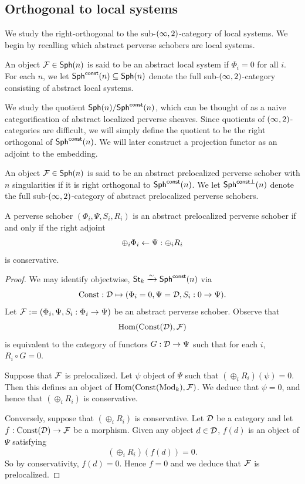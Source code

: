 \subsection{Orthogonal to local systems}\label{subsection:prelocalized}
We study the right-orthogonal to the sub-$(\infty,2)$-category of local systems.  We begin by recalling which abstract perverse schobers are local systems.

\begin{defn}\label{defn:constant}
    An object $\mathcal{F}\in\mathsf{Sph}(n)$ is said to be an abstract local system if $\Phi_i=0$ for all $i$. For each $n$, we let $\mathsf{Sph}^{\mathsf{const}}(n)\subseteq \mathsf{Sph}(n)$ denote the full sub-$(\infty,2)$-category consisting of abstract local systems.
\end{defn}

We study the quotient $\mathsf{Sph}(n)/\mathsf{Sph}^{\mathsf{const}}(n)$, which can be thought of as a naive categorification of abstract localized perverse sheaves. Since quotients of $(\infty,2)$-categories are difficult, we will simply define the quotient to be the right orthogonal of $\mathsf{Sph}^{\mathsf{const}}(n)$. We will later construct a projection functor as an adjoint to the embedding.

\begin{defn}
    An object $\mathcal{F}\in\mathsf{Sph}(n)$ is said to be an abstract prelocalized perverse schober with $n$ singularities if it is right orthogonal to $\mathsf{Sph}^{\mathsf{const}}(n)$. We let $\mathsf{Sph}^{\mathsf{const}\perp}(n)$ denote the full sub-$(\infty,2)$-category of abstract prelocalized perverse schobers.
\end{defn}

\begin{prop}\label{prop:conservative}
    A perverse schober $(\Phi_i,\Psi,S_i,R_i)$ is an abstract prelocalized perverse schober if and only if the right adjoint
    \[\oplus_i\Phi_i\leftarrow\Psi:\oplus_iR_i\]
    is conservative.
\end{prop}

\begin{proof}
    We may identify objectwise, $\mathsf{St}_k\xrightarrow{\sim}\mathsf{Sph}^{\mathsf{const}}(n)$ via
    \[\operatorname{Const}:\mathcal{D}\mapsto (\Phi_i=0,\Psi=\mathcal{D},S_i:0\to \Psi).\]
    Let $\mathcal{F}:=(\Phi_i,\Psi,S_i:\Phi_i\to\Psi)$ be an abstract perverse schober. Observe that
    \[\operatorname{Hom}(\operatorname{Const}(\mathcal{D}),\mathcal{F})\]
    is equivalent to the category of functors $G:\mathcal{D}\to\Psi$ such that for each $i$, $R_i\circ G=0$.
    
    Suppose that $\mathcal{F}$ is prelocalized. Let $\psi$ object of $\Psi$ such that $(\oplus_iR_i)(\psi)=0$. Then this defines an object of $\operatorname{Hom}(\operatorname{Const}(\operatorname{Mod}_k),\mathcal{F})$. We deduce that $\psi=0$, and hence that $(\oplus_iR_i)$ is conservative.

    Conversely, suppose that $(\oplus_iR_i)$ is conservative. Let $\mathcal{D}$ be a category and let $f:\operatorname{Const}(\mathcal{D})\to\mathcal{F}$ be a morphism. Given any object $d\in\mathcal{D}$, $f(d)$ is an object of $\Psi$ satisfying
    \[(\oplus_iR_i)(f(d))=0.\]
    So by conservativity, $f(d)=0$. Hence $f=0$ and we deduce that $\mathcal{F}$ is prelocalized.
\end{proof}

